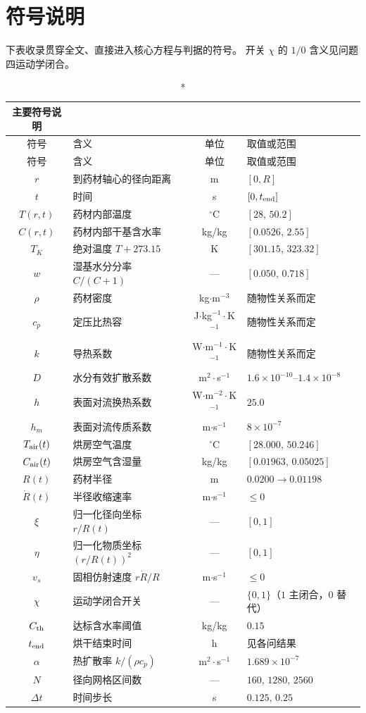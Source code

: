 \section{符号说明}

下表收录贯穿全文、直接进入核心方程与判据的符号。
开关 $\chi$ 的 $1/0$ 含义见问题四运动学闭合。

\setlength{\LTleft}{\fill}
\setlength{\LTright}{\fill}
\setlength{\LTpre}{0.5em}
\setlength{\LTpost}{0.4em}
\begin{longtable}{clcl}
\caption*{主要符号说明}\\
\toprule
符号 & 含义 & 单位 & 取值或范围 \\
\midrule
\endfirsthead
\toprule
符号 & 含义 & 单位 & 取值或范围 \\
\midrule
\endhead
\bottomrule
\endfoot
$r$ & 到药材轴心的径向距离 & m & $[0,R]$ \\
$t$ & 时间 & s & $[0,t_{\rm end}]$ \\
$T(r,t)$ & 药材内部温度 & $^\circ$C & $[28,\,50.2]$ \\
$C(r,t)$ & 药材内部干基含水率 & kg/kg & $[0.0526,\,2.55]$ \\
$T_K$ & 绝对温度 $T+273.15$ & K & $[301.15,\,323.32]$ \\
$w$ & 湿基水分分率 $C/(C+1)$ & --- & $[0.050,\,0.718]$ \\
$\rho$ & 药材密度 & kg$\cdot$m$^{-3}$ & 随物性关系而定 \\
$c_p$ & 定压比热容 & J$\cdot$kg$^{-1}\cdot$K$^{-1}$ & 随物性关系而定 \\
$k$ & 导热系数 & W$\cdot$m$^{-1}\cdot$K$^{-1}$ & 随物性关系而定 \\
$D$ & 水分有效扩散系数 & m$^2\cdot$s$^{-1}$ & $1.6\times10^{-10}$--$1.4\times10^{-8}$ \\
$h$ & 表面对流换热系数 & W$\cdot$m$^{-2}\cdot$K$^{-1}$ & $25.0$ \\
$h_m$ & 表面对流传质系数 & m$\cdot$s$^{-1}$ & $8\times10^{-7}$ \\
$T_{\rm air}(t)$ & 烘房空气温度 & $^\circ$C & $[28.000,\,50.246]$ \\
$C_{\rm air}(t)$ & 烘房空气含湿量 & kg/kg & $[0.01963,\,0.05025]$ \\
$R(t)$ & 药材半径 & m & $0.0200\to0.01198$ \\
$\dot R(t)$ & 半径收缩速率 & m$\cdot$s$^{-1}$ & $\le 0$ \\
$\xi$ & 归一化径向坐标 $r/R(t)$ & --- & $[0,1]$ \\
$\eta$ & 归一化物质坐标 $(r/R(t))^2$ & --- & $[0,1]$ \\
$v_s$ & 固相仿射速度 $r\dot R/R$ & m$\cdot$s$^{-1}$ & $\le 0$ \\
$\chi$ & 运动学闭合开关 & --- & $\{0,1\}$（$1$ 主闭合，$0$ 替代） \\
$C_{\rm th}$ & 达标含水率阈值 & kg/kg & $0.15$ \\
$t_{\rm end}$ & 烘干结束时间 & h & 见各问结果 \\
$\alpha$ & 热扩散率 $k/(\rho c_p)$ & m$^2\cdot$s$^{-1}$ & $1.689\times10^{-7}$ \\
$N$ & 径向网格区间数 & --- & $160,\,1280,\,2560$ \\
$\Delta t$ & 时间步长 & s & $0.125,\,0.25$ \\
\end{longtable}
\addtocounter{table}{-1}
